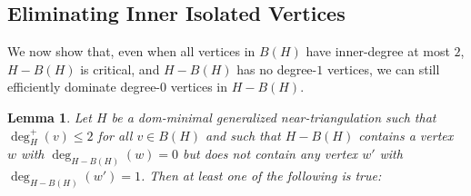 \documentclass{article}
\newtheorem{lem}{Lemma}
\theoremstyle{definition}
\begin{document}
\subsection{Eliminating Inner Isolated Vertices}
\label{zero_kill_sec}

We now show that, even when all vertices in $B(H)$ have inner-degree at most $2$, $H-B(H)$ is critical, and $H-B(H)$ has no degree-$1$ vertices, we can still efficiently dominate degree-$0$ vertices in $H-B(H)$.


\begin{lem}\label{degree_zero_killer}
  Let $H$ be a dom-minimal generalized near-triangulation such that $\deg^+_H(v)\le 2$ for all $v\in B(H)$ and such that $H-B(H)$ contains a vertex $w$ with $\deg_{H-B(H)}(w)=0$ but does not contain any vertex $w'$ with $\deg_{H-B(H)}(w')=1$.  Then at least one of the following is true:
\end{lem}
\end{document}

